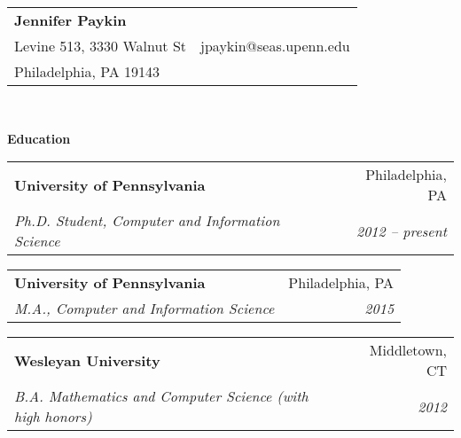 \documentclass[letterpaper,11pt]{article}
\makeatletter
\newcommand{\resitem}[1]{\item #1 \vspace{-2pt}}
\newcommand{\resheading}[1]{{\large \colorbox{mygrey}{\begin{minipage}{\textwidth}{\textbf{#1 \vphantom{p\^{E}}}}\end{minipage}}}}
\newcommand{\ressubheading}[4]{
\begin{tabular*}{7in}{l@{\extracolsep{\fill}}r} 
		\textbf{#1} & #2 \\
		\textit{#3} & \textit{#4} \\
\end{tabular*}\vspace{-2pt}}
\makeatother
\begin{document}
\newcommand{\myheader}{
\begin{tabular*}{7in}{l@{\extracolsep{\fill}}r}
	\textbf{\LARGE Jennifer Paykin}	    &  \\
        Levine 513, 3330 Walnut St          & jpaykin@seas.upenn.edu \\
        Philadelphia, PA 19143              & 
	\end{tabular*}
\\
\vspace{0.1in}}

\myheader


\resheading{Education}
        \ressubheading{University of Pennsylvania}{Philadelphia, PA}
            {Ph.D. Student, Computer and Information Science}
            {2012 -- present}
    \vspace{7pt}

        \ressubheading{University of Pennsylvania}{Philadelphia, PA}
            {M.A., Computer and Information Science}
            {2015}


    \vspace{7pt}
        \ressubheading{Wesleyan University}{Middletown, CT}
            {B.A. Mathematics and Computer Science (with high honors)}
            {2012}

    \vspace{5pt}


\end{document}
